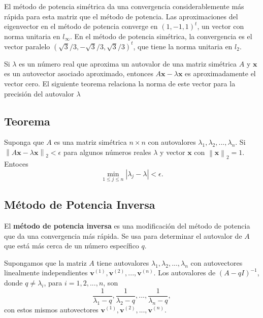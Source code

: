 \documentclass[12pt, a4paper]{article}
\numberwithin{subsection}{section} %
\begin{document}
            El método de potencia simétrica da una convergencia considerablemente más rápida para esta matriz que el método de potencia. Las aproximaciones del eigenvector en el método de potencia converge en $(1,-1, 1)^t$, un vector con norma unitaria en $l_{\infty}$. En el método de potencia simétrica, la convergencia es el vector paralelo $(\sqrt{3}/3, -\sqrt{3}/3, \sqrt{3}/3)^t$, que tiene la norma unitaria en $l_2$.
        
        Si $\lambda$ es un número real que aproxima un autovalor de una matriz simétrica $A$ y $\textbf{x}$ es un autovector asociado aproximado, entonces $A\textbf{x} - \lambda\textbf{x}$ es aproximadamente el vector cero. El siguiente teorema relaciona la norma de este vector para la precisión del autovalor $\lambda$
        
        \subsection{\textnormal{Teorema}}
        
        Suponga que $A$ es una matriz simétrica $n\times n$ con autovalores $\lambda_{1}, \lambda_{2}, ..., \lambda_{n}$. Si $\left\| A\textbf{x} - \lambda\textbf{x} \right\|_{2}<\epsilon$ para algunos números reales $\lambda$ y vector $\textbf{x}$ con $\left\| \textbf{x} \right\|_{2} = 1$. Entoces
        \begin{equation*}
        \min_{1\le j\le n}\left| \lambda_{j}-\lambda \right| < \epsilon.
        \end{equation*}
        
        \subsection{\textnormal{Método de Potencia Inversa}}
        
        El \textbf{método de potencia inversa} es una modificación del método de potencia que da una convergencia más rápida. Se usa para determinar el autovalor de $A$ que está más cerca de un número específico $q$.
        
        Supongamos que la matriz $A$ tiene autovalores $\lambda_{1}, \lambda_{2}, ..., \lambda_{n}$ con autovectores linealmente independientes $\textbf{v}^{\left( 1 \right)}, \textbf{v}^{\left( 2 \right)}, ..., \textbf{v}^{\left( n \right)}$. Los autovalores de $\left( A - qI \right)^{-1}$, donde $q\neq \lambda_{i}$, para $i = 1, 2, ..., n$, son
        \begin{equation*}
        \frac{1}{\lambda_{1} - q}, \frac{1}{\lambda_{2} - q}, ..., \frac{1}{\lambda_{n} - q},
        \end{equation*}
        con estos mismos autovectores $\textbf{v}^{\left( 1 \right)}, \textbf{v}^{\left( 2 \right)}, ..., \textbf{v}^{\left( n \right)}$.
        
\end{document}
